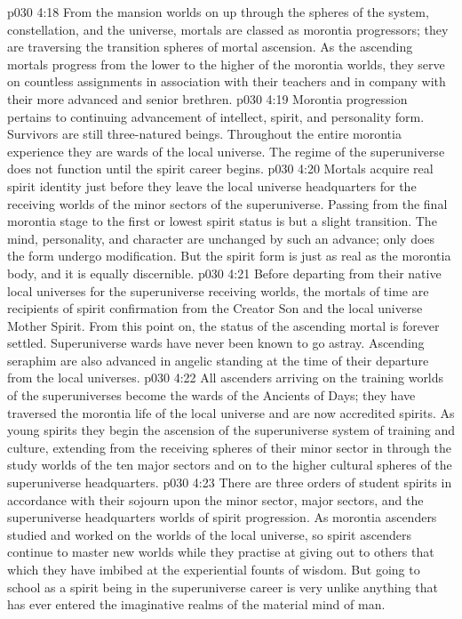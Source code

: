\vs p030 4:18 \bibnobreakspace {} From the mansion worlds on up through the spheres of the system, constellation, and the universe, mortals are classed as morontia progressors; they are traversing the transition spheres of mortal ascension. As the ascending mortals progress from the lower to the higher of the morontia worlds, they serve on countless assignments in association with their teachers and in company with their more advanced and senior brethren.
\vs p030 4:19 Morontia progression pertains to continuing advancement of intellect, spirit, and personality form. Survivors are still three\hyp{}natured beings. Throughout the entire morontia experience they are wards of the local universe. The regime of the superuniverse does not function until the spirit career begins.
\vs p030 4:20 Mortals acquire real spirit identity just before they leave the local universe headquarters for the receiving worlds of the minor sectors of the superuniverse. Passing from the final morontia stage to the first or lowest spirit status is but a slight transition. The mind, personality, and character are unchanged by such an advance; only does the form undergo modification. But the spirit form is just as real as the morontia body, and it is equally discernible.
\vs p030 4:21 Before departing from their native local universes for the superuniverse receiving worlds, the mortals of time are recipients of spirit confirmation from the Creator Son and the local universe Mother Spirit. From this point on, the status of the ascending mortal is forever settled. Superuniverse wards have never been known to go astray. Ascending seraphim are also advanced in angelic standing at the time of their departure from the local universes.
\vs p030 4:22 \bibnobreakspace {} All ascenders arriving on the training worlds of the superuniverses become the wards of the Ancients of Days; they have traversed the morontia life of the local universe and are now accredited spirits. As young spirits they begin the ascension of the superuniverse system of training and culture, extending from the receiving spheres of their minor sector in through the study worlds of the ten major sectors and on to the higher cultural spheres of the superuniverse headquarters.
\vs p030 4:23 There are three orders of student spirits in accordance with their sojourn upon the minor sector, major sectors, and the superuniverse headquarters worlds of spirit progression. As morontia ascenders studied and worked on the worlds of the local universe, so spirit ascenders continue to master new worlds while they practise at giving out to others that which they have imbibed at the experiential founts of wisdom. But going to school as a spirit being in the superuniverse career is very unlike anything that has ever entered the imaginative realms of the material mind of man.
